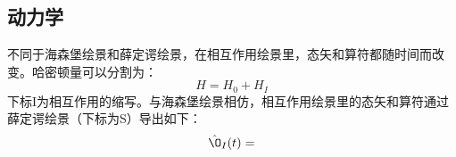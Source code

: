 \subsection{动力学}
不同于海森堡绘景和薛定谔绘景，在相互作用绘景里，态矢和算符都随时间而改变。哈密顿量可以分割为：
\begin{equation}
H=H_0+H_I
\end{equation}
下标I为相互作用的缩写。与海森堡绘景相仿，相互作用绘景里的态矢和算符通过薛定谔绘景（下标为S）导出如下：
\begin{equation}
\hat \O_I(t)=
\end{equation}


